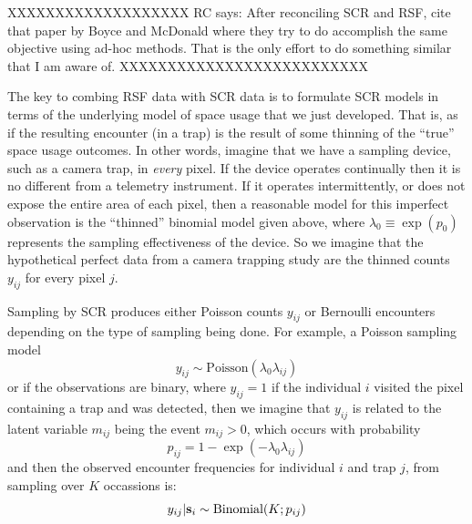 XXXXXXXXXXXXXXXXXXX
RC says: After reconciling SCR and RSF, cite that paper
by Boyce and McDonald where they try to do accomplish the same
objective using ad-hoc methods. That is the only effort to do
something similar that I am aware of.
XXXXXXXXXXXXXXXXXXXXXXXXXX

The key to combing RSF data with SCR data is to formulate SCR models
in terms of the underlying model of space usage that we just
developed. That is, as if the resulting encounter (in a trap) is the
result of some thinning of the ``true'' space usage outcomes.
In other words, imagine that we have a sampling
device, such as a camera trap, in {\it every} pixel. If the device
operates continually then it is no different from a telemetry
instrument.  If it operates intermittently, or does not expose the
entire area of each pixel, then a reasonable model for this imperfect
observation is the ``thinned'' binomial model given above, where
$\lambda_{0} \equiv \exp(p_{0})$ represents the sampling
effectiveness of the device. So we imagine that the hypothetical
perfect data from a camera trapping study are the thinned counts
$y_{ij}$ for every pixel $j$.

Sampling by SCR produces either Poisson counts $y_{ij}$ or Bernoulli
encounters depending on the type of sampling being done. For example,
a Poisson sampling model
\[
y_{ij} \sim \mbox{Poisson}(\lambda_{0} \lambda_{ij})
\]
or if the observations are binary,
where $y_{ij} = 1$ if the individual $i$ visited
the pixel containing a trap and was detected, then we imagine that
$y_{ij}$ is related to the latent variable $m_{ij}$ being the event
$m_{ij}>0$, which occurs with probability
\[
 p_{ij} = 1-\exp(- \lambda_{0} \lambda_{ij})
\]
and then the observed encounter frequencies for individual $i$ and trap $j$, from
sampling over $K$ occassions is:
\[
 y_{ij}|{\bf s}_{i} \sim \mbox{Binomial}(K; p_{ij})
\]

